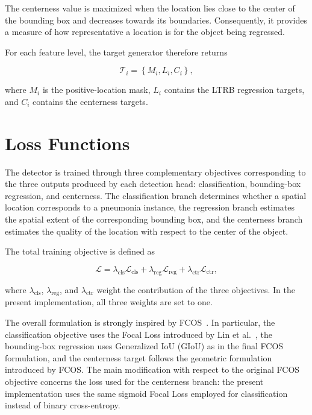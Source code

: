 \documentclass[11pt,a4paper]{article}
\begin{document}
The centerness value is maximized when the location lies close to the center
of the bounding box and decreases towards its boundaries. Consequently, it
provides a measure of how representative a location is for the object being
regressed.

For each feature level, the target generator therefore returns

\begin{equation}
\mathcal{T}_i =
\left\{
M_i,
L_i,
C_i
\right\},
\end{equation}

where $M_i$ is the positive-location mask, $L_i$ contains the LTRB regression
targets, and $C_i$ contains the centerness targets.








\section{Loss Functions}
\label{sec:losses}

The detector is trained through three complementary objectives corresponding
to the three outputs produced by each detection head: classification,
bounding-box regression, and centerness. The classification branch determines
whether a spatial location corresponds to a pneumonia instance, the
regression branch estimates the spatial extent of the corresponding
bounding box, and the centerness branch estimates the quality of the
location with respect to the center of the object.

The total training objective is defined as

\begin{equation}
\mathcal{L}
=
\lambda_{\mathrm{cls}}\mathcal{L}_{\mathrm{cls}}
+
\lambda_{\mathrm{reg}}\mathcal{L}_{\mathrm{reg}}
+
\lambda_{\mathrm{ctr}}\mathcal{L}_{\mathrm{ctr}},
\end{equation}

where $\lambda_{\mathrm{cls}}$, $\lambda_{\mathrm{reg}}$, and
$\lambda_{\mathrm{ctr}}$ weight the contribution of the three objectives.
In the present implementation, all three weights are set to one.

The overall formulation is strongly inspired by FCOS~\cite{tian2019fcos}.
In particular, the classification objective uses the Focal Loss introduced by
Lin et al.~\cite{lin2017focal}, the bounding-box regression uses Generalized
IoU (GIoU) as in the final FCOS formulation, and the centerness target follows
the geometric formulation introduced by FCOS. The main modification with
respect to the original FCOS objective concerns the loss used for the
centerness branch: the present implementation uses the same sigmoid Focal
Loss employed for classification instead of binary cross-entropy.
\end{document}
